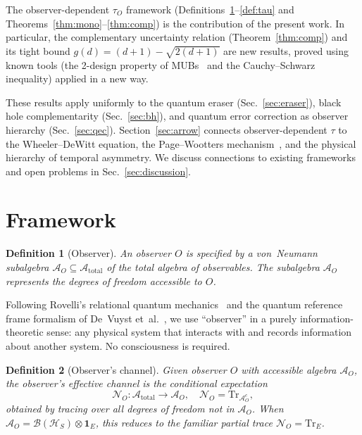 \documentclass[prl,twocolumn,superscriptaddress,longbibliography,floatfix]{revtex4-2}
\newtheorem{definition}{Definition}
\newcommand{\Tr}{\mathrm{Tr}}
\newcommand{\chan}{\mathcal{N}}
\newcommand{\hilb}{\mathcal{H}}
\newcommand{\tauasym}{\tau}
\newcommand{\algO}{\mathcal{A}}
\begin{document}
The observer-dependent $\tauasym_O$ framework
(Definitions~\ref{def:observer}--\ref{def:tau} and
Theorems~\ref{thm:mono}--\ref{thm:comp}) is the contribution
of the present work.  In particular, the complementary
uncertainty relation (Theorem~\ref{thm:comp}) and its tight
bound $g(d) = (d+1) - \sqrt{2(d+1)}$ are new results, proved
using known tools (the 2-design property of
MUBs~\cite{KlappeneckerRotteler2005} and the Cauchy--Schwarz
inequality) applied in a new way.

These results apply uniformly to the quantum
eraser (Sec.~\ref{sec:eraser}), black hole
complementarity (Sec.~\ref{sec:bh}), and quantum error
correction as observer hierarchy (Sec.~\ref{sec:qec}).
Section~\ref{sec:arrow} connects observer-dependent $\tauasym$
to the Wheeler--DeWitt equation, the Page--Wootters
mechanism~\cite{PageWootters1983}, and the physical hierarchy
of temporal asymmetry.  We discuss connections to existing
frameworks and open problems in Sec.~\ref{sec:discussion}.

\section{Framework}
\label{sec:framework}

\begin{definition}[Observer]
\label{def:observer}
An \emph{observer} $O$ is specified by a von~Neumann subalgebra
$\algO_O \subseteq \algO_{\mathrm{total}}$ of the total algebra
of observables.  The subalgebra $\algO_O$ represents the degrees
of freedom accessible to $O$.
\end{definition}

Following Rovelli's relational quantum
mechanics~\cite{Rovelli1996} and the quantum reference frame
formalism of De~Vuyst et~al.~\cite{DeVuyst2025}, we use
``observer'' in a purely information-theoretic sense:
any physical system that interacts with and records information
about another system.  No consciousness is required.

\begin{definition}[Observer's channel]
\label{def:channel}
Given observer $O$ with accessible algebra $\algO_O$, the
\emph{observer's effective channel} is the conditional
expectation
\begin{equation}
\chan_O : \algO_{\mathrm{total}} \to \algO_O, \quad
\chan_O = \Tr_{\algO_O^c},
\label{eq:obs_channel}
\end{equation}
obtained by tracing over all degrees of freedom not in $\algO_O$.
When $\algO_O = \mathcal{B}(\hilb_S) \otimes \mathbf{1}_E$,
this reduces to the familiar partial trace $\chan_O = \Tr_E$.
\end{definition}
\end{document}
